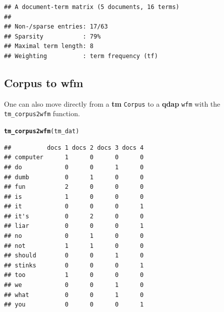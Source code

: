 \documentclass{article}\usepackage[]{graphicx}\usepackage[]{color}
\makeatletter
\newcommand{\hlstd}[1]{\textcolor[rgb]{0.345,0.345,0.345}{#1}}%
\newcommand{\hlkwd}[1]{\textcolor[rgb]{0.737,0.353,0.396}{\textbf{#1}}}%
\newenvironment{kframe}{%
 \def\at@end@of@kframe{}%
 \ifinner\ifhmode%
  \def\at@end@of@kframe{\end{minipage}}%
  \begin{minipage}{\columnwidth}%
 \fi\fi%
 \def\FrameCommand##1{\hskip\@totalleftmargin \hskip-\fboxsep
 \colorbox{shadecolor}{##1}\hskip-\fboxsep
     \hskip-\linewidth \hskip-\@totalleftmargin \hskip\columnwidth}%
 \MakeFramed {\advance\hsize-\width
   \@totalleftmargin\z@ \linewidth\hsize
   \@setminipage}}%
 {\par\unskip\endMakeFramed%
 \at@end@of@kframe}
\newenvironment{knitrout}{}{} %
\makeatother
\begin{document}
\begin{knitrout}
\color{fgcolor}\begin{kframe}
\begin{verbatim}
## A document-term matrix (5 documents, 16 terms)
## 
## Non-/sparse entries: 17/63
## Sparsity           : 79%
## Maximal term length: 8 
## Weighting          : term frequency (tf)
\end{verbatim}
\end{kframe}
\end{knitrout}


\subsection{Corpus to wfm}

\hspace{.4cm} One can also move directly from a \textbf{tm} \texttt{Corpus} to a \textbf{qdap} \texttt{wfm} with the \texttt{tm\_corpus2wfm} function.

\begin{knitrout}
\color{fgcolor}\begin{kframe}
\begin{alltt}
\hlkwd{tm_corpus2wfm}\hlstd{(tm_dat)}
\end{alltt}
\end{kframe}
\end{knitrout}


\begin{knitrout}
\color{fgcolor}\begin{kframe}
\begin{verbatim}
##          docs 1 docs 2 docs 3 docs 4
## computer      1      0      0      0
## do            0      0      1      0
## dumb          0      1      0      0
## fun           2      0      0      0
## is            1      0      0      0
## it            0      0      0      1
## it's          0      2      0      0
## liar          0      0      0      1
## no            0      1      0      0
## not           1      1      0      0
## should        0      0      1      0
## stinks        0      0      0      1
## too           1      0      0      0
## we            0      0      1      0
## what          0      0      1      0
## you           0      0      0      1
\end{verbatim}
\end{kframe}
\end{knitrout}
\end{document}
